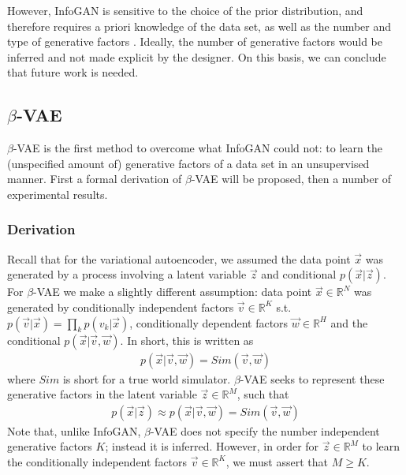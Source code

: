 However, InfoGAN is sensitive to the choice of the prior distribution, and therefore requires a priori knowledge of the data set, as well as the number and type of generative factors \cite{Thiagarajan2016}. Ideally, the number of generative factors would be inferred and not made explicit by the designer. On this basis, we can conclude that future work is needed.

\subsection{$\beta$-VAE}
$\beta$-VAE is the first method to overcome what InfoGAN could not: to learn the (unspecified amount of) generative factors of a data set in an unsupervised manner. First a formal derivation of $\beta$-VAE will be proposed, then a number of experimental results.

\subsubsection{Derivation}
Recall that for the variational autoencoder, we assumed the data point $\vec{x}$ was generated by a process involving a latent variable $\vec{z}$ and conditional $p(\vec{x}|\vec{z})$. For $\beta$-VAE we make a slightly different assumption: data point $\vec{x} \in \mathbb{R}^N$ was generated by conditionally independent factors $\vec{v} \in \mathbb{R}^K$ s.t. $p(\vec{v} | \vec{x}) = \prod_k p(v_k | \vec{x})$, conditionally dependent factors $\vec{w} \in \mathbb{R}^H$ and the conditional $p(\vec{x} | \vec{v}, \vec{w})$. In short, this is written as
\begin{align}
p(\vec{x}|\vec{v}, \vec{w}) = Sim(\vec{v}, \vec{w})
\end{align}
where $Sim$ is short for a true world simulator. $\beta$-VAE seeks to represent these generative factors in the latent variable $\vec{z} \in \mathbb{R}^M$, such that
\begin{align}
p(\vec{x} | \vec{z}) \approx p(\vec{x} | \vec{v}, \vec{w}) = Sim(\vec{v}, \vec{w})
\end{align}
Note that, unlike InfoGAN, $\beta$-VAE does not specify the number independent generative factors $K$; instead it is inferred. However, in order for $\vec{z} \in \mathbb{R}^M$ to learn the conditionally independent factors $\vec{v} \in \mathbb{R}^K$, we must assert that $M \geq K$.

